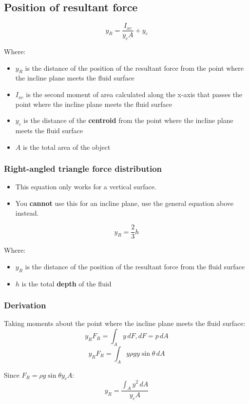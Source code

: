 \documentclass[11pt]{article}
\begin{document}
\subsection{Position of resultant force}
\label{sec:org1a5b230}
\[y_R = \frac{I_{xc}}{y_c A} + y_c\]

Where:
\begin{itemize}
\item \(y_R\) is the distance of the position of the resultant force from the point where the incline plane meets the fluid surface
\item \(I_{xc}\) is the second moment of area calculated along the x-axis that passes the point where the incline plane meets the fluid surface
\item \(y_c\) is the distance of the \textbf{centroid} from the point where the incline plane meets the fluid surface
\item \(A\) is the total area of the object
\end{itemize}
\subsubsection{Right-angled triangle force distribution}
\label{sec:org9bbfa0f}
\begin{itemize}
\item This equation only works for a vertical surface.
\item You \textbf{cannot} use this for an incline plane, use the general equation above instead.
\end{itemize}

\[y_R = \frac{2}{3} h\]

Where:
\begin{itemize}
\item \(y_R\) is the distance of the position of the resultant force from the fluid surface
\item \(h\) is the total \textbf{depth} of the fluid
\end{itemize}

\newpage
\subsubsection{Derivation}
\label{sec:org50998c7}
Taking moments about the point where the incline plane meets the fluid surface:
\[y_R F_R = \int_A y \, dF, dF = p \, dA\]
\[y_R F_R = \int_A y \rho g y \sin \theta \, dA\]

Since \(F_R = \rho g \sin \theta y_c A\):
\[y_R = \frac{\int_A y^2 \, dA}{y_c A}\]
\end{document}

